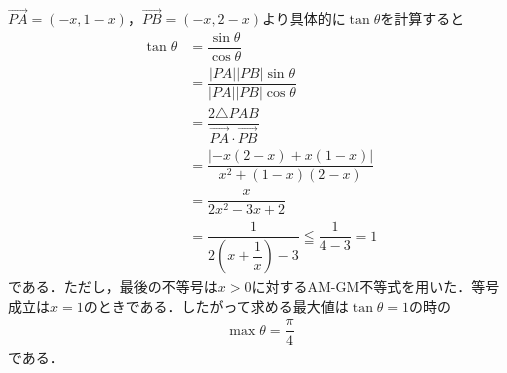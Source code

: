 \documentclass[../../main.tex]{subfiles}
\begin{document}
$\overrightarrow{PA}=(-x,1-x)$，$\overrightarrow{PB}=(-x,2-x)$より具体的に$\tan\theta$を計算すると
\begin{align}
  \tan\theta
  &=\dfrac{\sin\theta}{\cos\theta} \\
  &=\dfrac{|PA||PB|\sin\theta}{|PA||PB|\cos\theta} \\
  &=\dfrac{2\triangle PAB}{\overrightarrow{PA}\cdot\overrightarrow{PB}} \\
  &=\dfrac{|{-x(2-x)+x(1-x)}|}{x^2+(1-x)(2-x)}\\
  &=\dfrac{x}{2x^2-3x+2}\\
  &=\dfrac{1}{2(x+\dfrac{1}{x})-3}\leqq\dfrac{1}{4-3}=1
\end{align}
である．ただし，最後の不等号は$x>0$に対するAM-GM不等式を用いた．等号成立は$x=1$のときである．したがって求める最大値は$\tan\theta=1$の時の
\begin{align}
  \max\theta=\dfrac{\pi}{4}
\end{align}
である．
\end{document}
